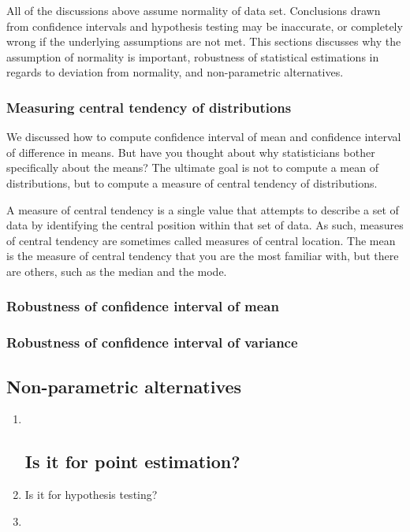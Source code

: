 \documentclass[11pt]{article}
\begin{document}
All of the discussions above assume normality of data set. Conclusions
drawn from confidence intervals and hypothesis testing may be
inaccurate, or completely wrong if the underlying assumptions are not
met. This sections discusses why the assumption of normality is
important, robustness of statistical estimations in regards to deviation
from normality, and non-parametric alternatives.

\subsubsection{Measuring central tendency of
distributions}\label{measuring-central-tendency-of-distributions}

We discussed how to compute confidence interval of mean and confidence
interval of difference in means. But have you thought about why
statisticians bother specifically about the means? The ultimate goal is
not to compute a mean of distributions, but to compute a measure of
central tendency of distributions.

A measure of central tendency is a single value that attempts to
describe a set of data by identifying the central position within that
set of data. As such, measures of central tendency are sometimes called
measures of central location. The mean is the measure of central
tendency that you are the most familiar with, but there are others, such
as the median and the mode.

\subsubsection{Robustness of confidence interval of
mean}\label{robustness-of-confidence-interval-of-mean}

\subsubsection{Robustness of confidence interval of
variance}\label{robustness-of-confidence-interval-of-variance}

\subsection{Non-parametric
alternatives}\label{non-parametric-alternatives}

    \begin{enumerate}
\def\labelenumi{\arabic{enumi}.}
\item ~
  \subsection{Is it for point
  estimation?}\label{is-it-for-point-estimation}
\item
  Is it for hypothesis testing?
\item
\end{enumerate}
\end{document}
